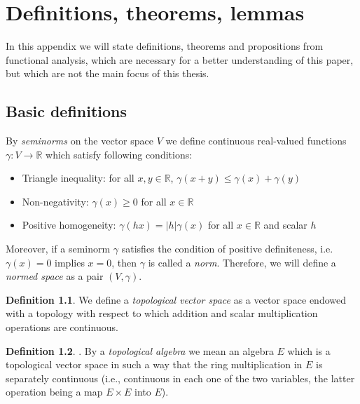 \documentclass[12pt,a4paper]{report}
\theoremstyle{definition}
\newtheorem{definition}{Definition}
\begin{document}
\begin{appendix} \label{anhang}
	\chapter{Definitions, theorems, lemmas} %
	
	In this appendix we will state definitions, theorems and propositions from functional analysis, which are necessary for a better understanding of this paper, but which are not the main focus of this thesis.
	
	\section{Basic definitions}
	
	By \textit{seminorms} on the vector space $V$ we define continuous real-valued functions $\gamma:V\rightarrow \mathbb{R}$ which satisfy following conditions:
	
	\begin{itemize}
		\item Triangle inequality: for all $x,y\in \mathbb{R}$, $\gamma(x+y)\leq\gamma(x)+\gamma(y)$ 
		\item Non-negativity: $\gamma(x)\geq0$ for all $x\in \mathbb{R}$
		\item Positive homogeneity: $\gamma(hx)=|h|\gamma(x)$ for all $x\in \mathbb{R}$ and scalar $h$
	\end{itemize}

Moreover, if a seminorm $\gamma$ satisfies the condition of positive definiteness, i.e. $\gamma(x) = 0$ implies $x = 0$, then $\gamma$ is called a \textit{norm}. Therefore, we will define a \textit{normed space} as a pair $(V,\gamma)$.


	
	\begin{definition}
		We define a \textit{topological vector space} as a vector space endowed with a topology with respect to which addition and scalar multiplication operations are continuous.
	\end{definition}

\begin{definition}\parencite[see][]{mallios2011topological}.
	By a \textit{topological algebra} we mean an algebra $E$ which is a topological vector space in such a way that the ring multiplication in $E$ is separately continuous (i.e., continuous in each one of the two variables, the latter operation being a map $E\times E$ into $E$).
\end{definition}


\end{appendix}
\end{document}

